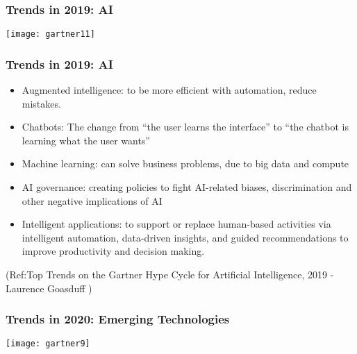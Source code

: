 \begin{frame}[fragile]\frametitle{Trends in 2019: AI}

\begin{center}
\texttt{[image: gartner11]}
\end{center}

\end{frame}


\begin{frame}[fragile]\frametitle{Trends in 2019: AI}
\begin{itemize}
\item Augmented intelligence: to be more efficient with automation, reduce mistakes.
\item Chatbots: The change from “the user learns the interface” to “the chatbot is learning what the user wants” 
\item Machine learning: can solve business problems, due to big data and compute
\item AI governance: creating policies to fight AI-related biases, discrimination and other negative implications of AI
\item Intelligent applications: to support or replace human-based activities via intelligent automation, data-driven insights, and guided recommendations to improve productivity and decision making. 

\end{itemize}


{\tiny (Ref:Top Trends on the Gartner Hype Cycle for Artificial Intelligence, 2019 - 
Laurence Goasduff )}

\end{frame}

\begin{frame}[fragile]\frametitle{Trends in 2020: Emerging Technologies}

\begin{center}
\texttt{[image: gartner9]}
\end{center}


\end{frame}

